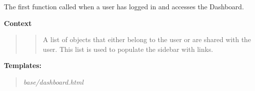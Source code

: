 \documentclass[letterpaper,10pt,english]{sphinxmanual}
\begin{document}

\begin{fulllineitems}
\label{modules/webapp:webapp.views.group_by_mean}
\end{fulllineitems}


\begin{fulllineitems}
\label{modules/webapp:webapp.views.heatmap}
\end{fulllineitems}


\begin{fulllineitems}
\label{modules/webapp:webapp.views.landing}
The first function called when a user has logged in and accesses the Dashboard.

\textbf{Context}
\begin{quote}

\begin{quote}

A list of {\hyperref[modules/microdata:microdata.models.Device]{\emph{}}} objects that either belong to the user or are shared with the user.
This list is used to populate the sidebar with {\hyperref[modules/microdata:microdata.models.Device]{\emph{}}} links.
\end{quote}
\end{quote}

\textbf{Templates:}
\begin{quote}

\emph{base/dashboard.html}
\end{quote}

\end{fulllineitems}


\begin{fulllineitems}
\label{modules/webapp:webapp.views.make_choices}
\end{fulllineitems}
\end{document}
